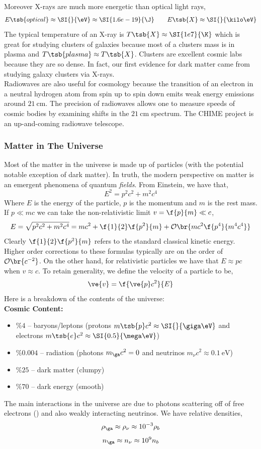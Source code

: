 \documentclass{article}
\begin{document}
Moreover X-rays are much more energetic than optical light rays,
\[ E\tsb{optical} \approx \SI{}{\eV} \approx \SI{1.6e-19}{\J} \qquad E\tsb{X} \approx \SI{}{\kilo\eV} \]
The typical temperature of an X-ray is $T\tsb{X} \approx \SI{1e7}{\K}$ which is great for studying clusters of galaxies because most of a clusters mass is in plasma and $T\tsb{plasma} \approx T\tsb{X}$. Clusters are excellent cosmic labs because they are so dense. In fact, our first evidence for dark matter came from studying galaxy clusters via X-rays. \\

Radiowaves are also useful for cosmology because the transition of an electron in a neutral hydrogen atom from spin up to spin down emits weak energy emissions around $\SI{21}{\cm}$. The precision of radiowaves allows one to measure speeds of cosmic bodies by examining shifts in the $\SI{21}{\cm}$ spectrum. The CHIME project is an up-and-coming radiowave telescope.

\subsubsection{Matter in The Universe}

Most of the matter in the universe is made up of particles (with the potential notable exception of dark matter). In truth, the modern perspective on matter is an emergent phenomena of quantum \textit{fields}. From Einstein, we have that,
\[ E^2 = p^2 c^2 + m^2 c^4 \]
Where $E$ is the energy of the particle, $p$ is the momentum and $m$ is the rest mass. If $p \ll m c$ we can take the non-relativistic limit $v = \f{p}{m} \ll c$,
\[ E = \sqrt{p^2 c^2 + m^2 c^4} = mc^2 + \f{1}{2}\f{p^2}{m} + \mathcal{O}\br{m c^2 \f{p^4}{m^4 c^4}} \]
Clearly $\f{1}{2}\f{p^2}{m}$ refers to the standard classical kinetic energy. Higher order corrections to these formulas typically are on the order of $\mathcal{O}\br{c^{-2}}$. On the other hand, for relativistic particles we have that $E \approx pc$ when $v \approx c$. To retain generality, we define the velocity of a particle to be,
\[ \ve{v} = \f{\ve{p}c^2}{E} \]
Here is a breakdown of the contents of the universe: \\
\textbf{Cosmic Content:}
\begin{itemize}
    \item $\%4$ -- baryons/leptons (protons $m\tsb{p} c^2 \approx \SI{}{\giga\eV}$ and electrons $m\tsb{e} c^2 \approx \SI{0.5}{\mega\eV}$)
    \item $\%0.004$ -- radiation (photons $m_{\ga}c^2 = 0$ and neutrinos $m_{\nu}c^2 \approx \SI{0.1}{\eV}$)
    \item $\%25$ -- dark matter (clumpy)
    \item $\%70$ -- dark energy (smooth)
\end{itemize}
The main interactions in the universe are due to photons scattering off of free electrons () and also weakly interacting neutrinos. We have relative densities,
\[ \rho_{\ga} \approx \rho_{\nu} \approx 10^{-3} \rho_{b} \]
\[ n_{\ga} \approx n_{\nu} \approx 10^{9} n_{b} \]
\end{document}
